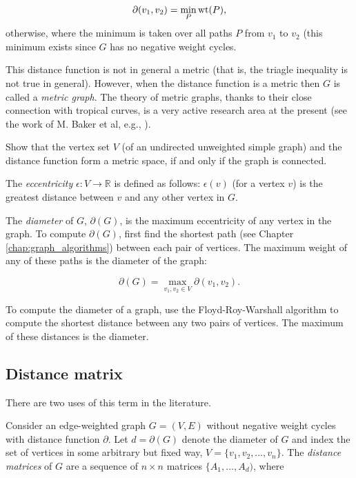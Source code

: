 \[
\partial(v_1,v_2) = 
\min_P {\rm wt}(P),
\]
otherwise, where the minimum is taken over all paths $P$
from $v_1$ to $v_2$ (this minimum exists since 
$G$ has no negative weight cycles. 

This distance function is not in general a metric
(that is, the triagle inequality is not true in general).
However, when the distance function is a 
metric then $G$ is called a {\it metric graph}.
The theory of metric graphs, thanks to their close
connection with tropical curves, is a very active
research area at the present (see the work of 
M. Baker et al, e.g., \cite{BakerFaber2006}).

\begin{exercise}
Show that the vertex set $V$ (of an undirected unweighted simple graph) 
and the distance function form
a metric space, if and only if the graph is connected.
\end{exercise}

The {\it eccentricity} $\epsilon:V\to  {\mathbb{R}}$ is defined as follows:
$\epsilon (v)$ (for a vertex $v$) is the greatest distance between $v$
and any other vertex in $G$.

The {\it diameter} of $G$, $\partial(G)$, is the maximum 
eccentricity of any vertex in the graph. To compute
$\partial(G)$, first find the shortest path (see Chapter
\ref{chap:graph_algorithms}) between each pair of 
vertices. The maximum weight of any of
these paths is the diameter of the graph:

\[
\partial(G) = \max_{v_1,v_2\in V} \partial(v_1,v_2).
\]

To compute the diameter of a graph, use the Floyd-Roy-Warshall
algorithm to compute the shortest distance between any
two pairs of vertices. The maximum of these distances is the
diameter.


\subsection{Distance matrix}

There are two uses of this term in the literature.

Consider an edge-weighted graph $G=(V,E)$ without negative weight
cycles with distance function $\partial$. Let $d=\partial(G)$
denote the diameter of $G$ and index the
set of vertices in some arbitrary but fixed way,
$V=\{v_1,v_2,\dots, v_n\}$. 
The {\it distance matrices} of $G$ are a sequence of $n\times n$ matrices
$\{A_1,\dots, A_d)$, where

